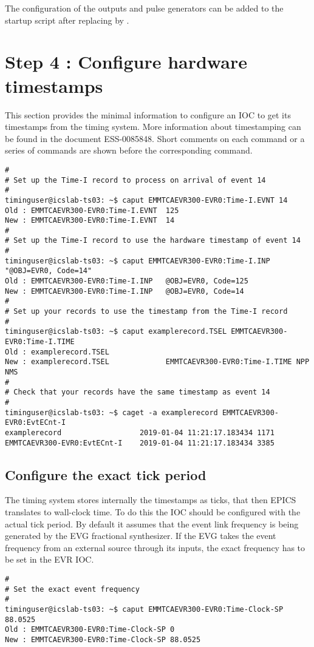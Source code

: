 \documentclass[11pt
  , a4paper
  , article
  , oneside
  , showtrims
]{memoir}
\begin{document}
{The configuration of the outputs and pulse generators can be added to the startup script after  replacing  by .


\section{Step 4 : Configure hardware timestamps}
This section provides the minimal information to configure an IOC to get its timestamps from the timing system. More information about timestamping can be found in the document ESS-0085848. Short comments on each command or a series of commands are shown before the corresponding command.
\begin{lstlisting}[style=termstyle]
#
# Set up the Time-I record to process on arrival of event 14
#
timinguser@icslab-ts03: ~$ caput EMMTCAEVR300-EVR0:Time-I.EVNT 14
Old : EMMTCAEVR300-EVR0:Time-I.EVNT  125
New : EMMTCAEVR300-EVR0:Time-I.EVNT  14
#
# Set up the Time-I record to use the hardware timestamp of event 14
#
timinguser@icslab-ts03: ~$ caput EMMTCAEVR300-EVR0:Time-I.INP "@OBJ=EVR0, Code=14"
Old : EMMTCAEVR300-EVR0:Time-I.INP   @OBJ=EVR0, Code=125
New : EMMTCAEVR300-EVR0:Time-I.INP   @OBJ=EVR0, Code=14
#
# Set up your records to use the timestamp from the Time-I record
#
timinguser@icslab-ts03: ~$ caput examplerecord.TSEL EMMTCAEVR300-EVR0:Time-I.TIME
Old : examplerecord.TSEL
New : examplerecord.TSEL             EMMTCAEVR300-EVR0:Time-I.TIME NPP NMS
#
# Check that your records have the same timestamp as event 14
#
timinguser@icslab-ts03: ~$ caget -a examplerecord EMMTCAEVR300-EVR0:EvtECnt-I
examplerecord                  2019-01-04 11:21:17.183434 1171
EMMTCAEVR300-EVR0:EvtECnt-I    2019-01-04 11:21:17.183434 3385
\end{lstlisting}

\subsection{Configure the exact tick period}
The timing system stores internally the timestamps as ticks, that then EPICS translates to wall-clock time. To do this the IOC should be configured with the actual tick period. By default it assumes that the event link frequency is being generated by the EVG fractional synthesizer. If the EVG takes the event frequency from an external source through its inputs, the exact frequency has to be set in the EVR IOC.
\begin{lstlisting}[style=termstyle]
#
# Set the exact event frequency
#
timinguser@icslab-ts03: ~$ caput EMMTCAEVR300-EVR0:Time-Clock-SP 88.0525
Old : EMMTCAEVR300-EVR0:Time-Clock-SP 0
New : EMMTCAEVR300-EVR0:Time-Clock-SP 88.0525
\end{lstlisting}


}
\end{document}
